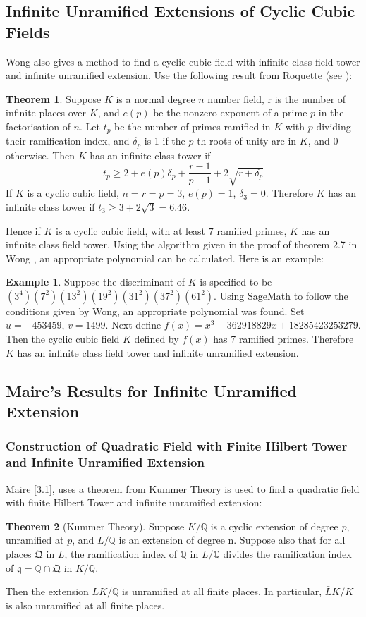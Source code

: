 \documentclass[12pt]{extarticle}
\newcommand{\Q}{\mathbb{Q}}
\newcommand{\<}{\langle}
\renewcommand{\>}{\rangle}
\theoremstyle{definition}
\newtheorem{theorem}{Theorem}
\newtheorem*{example}{Example}
\begin{document}
\subsection{Infinite Unramified Extensions of Cyclic Cubic Fields }
Wong also gives a method to find a cyclic cubic field with infinite class field tower and infinite unramified extension. Use the following result from Roquette (see \cite{Koch}):
\begin{theorem}
    Suppose $K$ is a normal degree $n$ number field, r is the number of infinite places over $K$, and $e(p)$ be the nonzero exponent of a prime $p$ in the factorisation of $n$. Let $t_p$ be the number of primes ramified in $K$ with $p$ dividing their ramification index, and $\delta_p$ is 1 if the $p$-th roots of unity are in $K$, and 0 otherwise. Then $K$ has an infinite class tower if \begin{equation}
        t_p\geqslant 2 + e(p)\delta_p + \frac{r-1}{p-1} + 2 \sqrt{r+\delta_p} 
    \end{equation}
 If $K$ is a cyclic cubic field,  $n=r=p=3$, $e(p)=1$, $\delta_3 = 0$. Therefore $K$ has an infinite class tower if $t_3 \geq 3 + 2\sqrt{3} = 6.46$. 
\end{theorem}
Hence if $K$ is a cyclic cubic field, with at least $7$ ramified primes, $K$ has an infinite class field tower. Using the algorithm given in the proof of theorem 2.7 in Wong \cite{WONG}, an appropriate polynomial can be calculated. Here is an example:
\begin{example}
    Suppose the discriminant of $K$ is specified to be $(3^4)(7^2)(13^2)(19^2)(31^2)(37^2)(61^2)$. Using SageMath to follow the conditions given by Wong, an appropriate polynomial was found. Set $u = -453459$, $v=1499$.  Next define $f(x) = x^3-362918829x + 18285423253279$. Then the cyclic cubic field $K$ defined by $f(x)$ has 7 ramified primes. Therefore $K$ has an infinite class field tower and infinite unramified extension. 
\end{example}




\subsection{Maire's Results for Infinite Unramified Extension}
\subsubsection*{Construction of Quadratic Field with Finite Hilbert Tower and Infinite Unramified Extension}
Maire \cite{MAIR}[3.1], uses a theorem from Kummer Theory is used to find a quadratic field with finite Hilbert Tower and infinite unramified extension:
\begin{theorem}[Kummer Theory]
Suppose $K/\Q$ is a cyclic extension of degree $p$, unramified at $p$, and $L/\Q$ is an extension of degree n. Suppose also that for all places $\mathfrak{Q}$ in $L$, the ramification index of $\Q$ in $L/\Q$ divides the ramification index of $\mathfrak{q} = \Q\cap\mathfrak{Q}$ in $K/\Q$. \par
Then the extension $LK/\Q$ is unramified at all finite places. In particular, $\bar{L}K/K$ is also unramified at all finite places.
\end{theorem}
\end{document}
